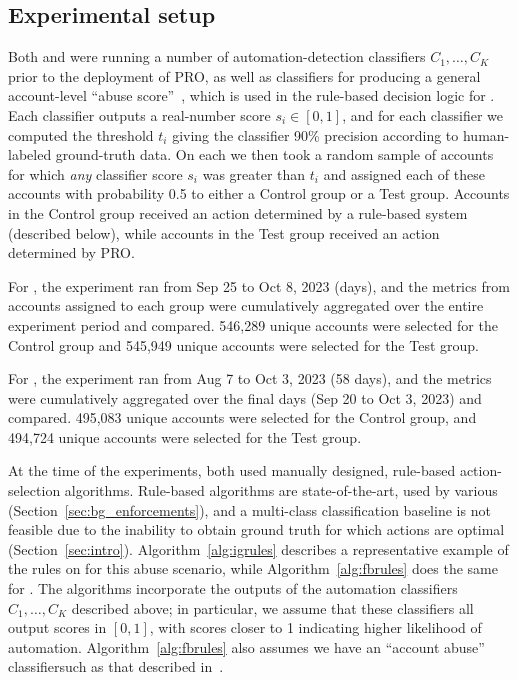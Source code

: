 \subsection{Experimental setup}

Both \ig and \fb were running a number of automation-detection classifiers $C_1, \ldots, C_K$ prior to the deployment of PRO, as well as classifiers for producing a general account-level ``abuse score''\ifanon\else~\cite{xu2021deep}\fi, which is used in the rule-based decision logic for \fb. Each classifier outputs a real-number score $s_i \in [0,1]$, and for each classifier we computed the threshold $t_i$ giving the classifier 90\% precision according to human-labeled ground-truth data.
On each \osn we then took a random sample of accounts for which {\em any} classifier score $s_i$ was greater than $t_i$ and assigned each of these accounts with probability 0.5 to either a Control group or a Test group. Accounts in the Control group received an action determined by a rule-based system (described below), while accounts in the Test group received an action determined by PRO.

For \ig, the experiment ran from Sep 25 to Oct 8, 2023 (\igdays days), and the metrics from accounts assigned to each group were cumulatively aggregated over the entire experiment period and compared.
546,289 unique accounts were selected for the Control group and 545,949 unique accounts were selected for the Test group.

For \fb, the experiment ran from Aug 7 to Oct 3, 2023 (58 days), and the metrics were cumulatively aggregated over the final \fbdays days (Sep 20 to Oct 3, 2023) and compared.
495,083 unique accounts were selected for the Control group, and 494,724 unique accounts were selected for the Test group.

At the time of the experiments, both \osns used manually designed, rule-based action-selection algorithms. Rule-based algorithms are state-of-the-art, used by various \osns (Section~\ref{sec:bg_enforcements}), and a multi-class classification baseline is not feasible due to the inability to obtain ground truth for which actions are optimal (Section~\ref{sec:intro}). Algorithm~\ref{alg:igrules} describes a representative example of the rules on \ig for this abuse scenario, while Algorithm~\ref{alg:fbrules} does the same for \fb. The algorithms incorporate the outputs of the automation classifiers $C_1,\ldots,C_K$ described above; in particular, we assume that these classifiers all output scores in $[0,1]$, with scores closer to 1 indicating higher likelihood of automation. Algorithm~\ref{alg:fbrules} also assumes we have an ``account abuse'' classifier\ifanon\else{ }such as that described in~\cite{xu2021deep}\fi.

